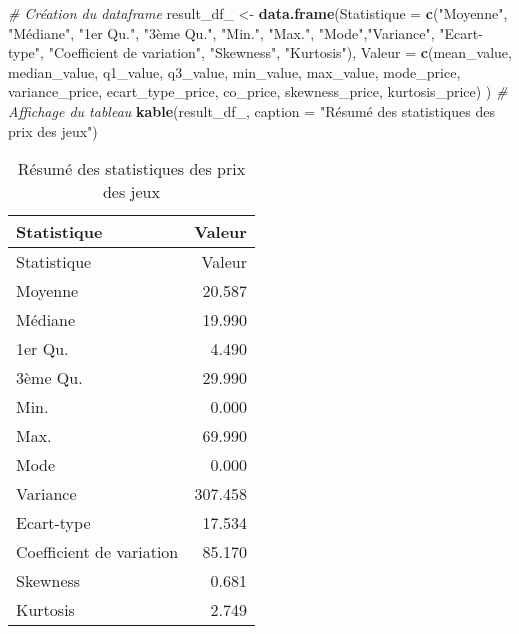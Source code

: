 \documentclass[mstat,12pt]{unswthesis}
\newenvironment{Shaded}{\begin{snugshade}}{\end{snugshade}}
\newcommand{\AttributeTok}[1]{\textcolor[rgb]{0.13,0.29,0.53}{#1}}
\newcommand{\CommentTok}[1]{\textcolor[rgb]{0.56,0.35,0.01}{\textit{#1}}}
\newcommand{\FunctionTok}[1]{\textcolor[rgb]{0.13,0.29,0.53}{\textbf{#1}}}
\newcommand{\NormalTok}[1]{#1}
\newcommand{\OtherTok}[1]{\textcolor[rgb]{0.56,0.35,0.01}{#1}}
\newcommand{\StringTok}[1]{\textcolor[rgb]{0.31,0.60,0.02}{#1}}
\begin{document}
\begin{Shaded}
\begin{Highlighting}[]
\CommentTok{\# Création du dataframe}
\NormalTok{result\_df\_ }\OtherTok{\textless{}{-}} \FunctionTok{data.frame}\NormalTok{(}\AttributeTok{Statistique =} \FunctionTok{c}\NormalTok{(}\StringTok{"Moyenne"}\NormalTok{, }\StringTok{"Médiane"}\NormalTok{, }\StringTok{"1er Qu."}\NormalTok{,}
                                         \StringTok{"3ème Qu."}\NormalTok{, }\StringTok{"Min."}\NormalTok{, }\StringTok{"Max."}\NormalTok{, }
                                         \StringTok{"Mode"}\NormalTok{,}\StringTok{"Variance"}\NormalTok{, }
                                         \StringTok{"Ecart{-}type"}\NormalTok{, }
                                         \StringTok{"Coefficient de variation"}\NormalTok{, }
                                         \StringTok{"Skewness"}\NormalTok{, }\StringTok{"Kurtosis"}\NormalTok{),}
  \AttributeTok{Valeur =} \FunctionTok{c}\NormalTok{(mean\_value, median\_value, q1\_value, q3\_value, min\_value,}
\NormalTok{             max\_value, mode\_price, variance\_price, ecart\_type\_price, }
\NormalTok{             co\_price, skewness\_price, kurtosis\_price)}
\NormalTok{)}
\CommentTok{\# Affichage du tableau}
\FunctionTok{kable}\NormalTok{(result\_df\_, }\AttributeTok{caption =} \StringTok{"Résumé des statistiques des prix des jeux"}\NormalTok{)}
\end{Highlighting}
\end{Shaded}

\begin{longtable}[]{@{}lr@{}}
\caption{Résumé des statistiques des prix des jeux}\tabularnewline
\toprule\noalign{}
Statistique & Valeur \\
\midrule\noalign{}
\endfirsthead
\toprule\noalign{}
Statistique & Valeur \\
\midrule\noalign{}
\endhead
\bottomrule\noalign{}
\endlastfoot
Moyenne & 20.587 \\
Médiane & 19.990 \\
1er Qu. & 4.490 \\
3ème Qu. & 29.990 \\
Min. & 0.000 \\
Max. & 69.990 \\
Mode & 0.000 \\
Variance & 307.458 \\
Ecart-type & 17.534 \\
Coefficient de variation & 85.170 \\
Skewness & 0.681 \\
Kurtosis & 2.749 \\
\end{longtable}
\end{document}
